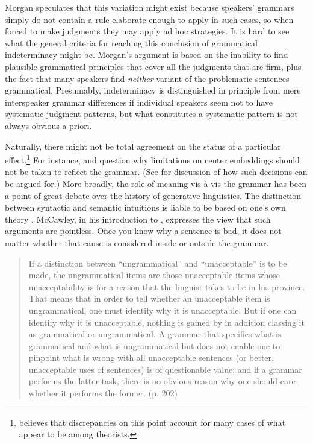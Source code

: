 
\noindent
Morgan speculates that this  variation might exist because speakers' grammars simply do not contain a rule elaborate enough to apply in such cases, so when forced to make judgments they may apply ad hoc strategies. It is hard to see what the general criteria for reaching this conclusion of grammatical indeterminacy might be. Morgan's argument is based on the inability to find plausible grammatical principles that cover all the judgments that are firm, plus the fact that many speakers find \textit{neither} variant of the problematic sentences grammatical. Presumably, indeterminacy is distinguished in principle from mere interspeaker grammar differences if individual speakers seem not to have systematic judgment patterns, but what constitutes a systematic pattern is not always obvious a priori.


Naturally, there might not be total agreement on the status of a particular effect.\footnote{\citet{Newmeyer1983} believes that discrepancies on this point account for many cases of what appear to be  among theorists.
} For instance, \citet{Reich1969} and \citet{Spencer1973} question why limitations on center embeddings should not  be taken to reflect the grammar. (See \citet{KatzEtAl1976} for discussion of how such decisions can be argued for.) More broadly, the role of meaning vis-à-vis the grammar has been a point of great debate over the history of generative linguistics. The distinction between syntactic and semantic intuitions is liable to be based on one's own theory \citep{Cohen1981}. McCawley, in his introduction to \citet{Postal1976}, expresses the view that such arguments are pointless. Once you know why a sentence is bad, it does not matter whether that cause is considered inside or outside the grammar.

\begin{quote}
If a distinction between ``ungrammatical'' and ``unacceptable'' is to be made, the ungrammatical items are those unacceptable items whose unacceptability is for a reason that the linguist takes to be in his province. That means that in order to tell whether an unacceptable item is ungrammatical, one must identify why it is unacceptable. But if one can identify why it is unacceptable, nothing is gained by in addition classing it as grammatical or ungrammatical. A grammar that specifies what is grammatical and what is ungrammatical but does not enable one to pinpoint what is wrong with all unacceptable sentences (or better, unacceptable uses of sentences) is of questionable value; and if a grammar performs the latter task, there is no obvious reason why one should care whether it performs the former. (p. 202)
\end{quote}

